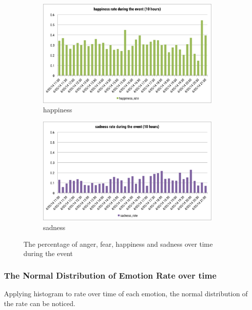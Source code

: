 \begin{figure}[htb!]
\begin{subfigure}{0.5\textwidth} 
\centering    
\includegraphics[width=0.98\linewidth]{HappinessRateEvent}
\caption{happiness}
\label{fig:happinessRateEvent}
\end{subfigure}%
\begin{subfigure}{0.5\textwidth}
\centering    
\includegraphics[width=0.98\linewidth]{SadnessRateEvent}
\caption{sadness}
\label{fig:sadnessRateEvent}
\end{subfigure}
\caption{The percentage of anger, fear, happiness and sadness over time during the event}
\end{figure}

\subsubsection{The Normal Distribution of Emotion Rate over time}
Applying histogram to rate over time of each emotion, the normal distribution of the rate can be noticed.

